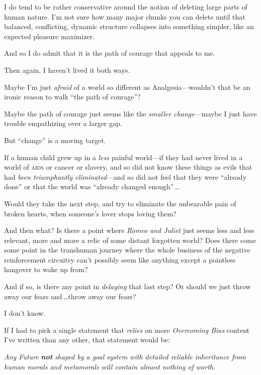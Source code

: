  I do tend to be rather conservative around the notion of deleting
large parts of human nature. I'm not sure how many
major chunks you can delete until that balanced, conflicting, dynamic
structure collapses into something simpler, like an expected pleasure
maximizer.


 And so I do admit that it is the path of courage that appeals to
me.


 Then again, I haven't lived it both ways.


 Maybe I'm just \textit{afraid} of a world so
different as Analgesia---wouldn't that be an ironic
reason to walk ``the path of
courage''?

{
 Maybe the path of courage just seems like the \textit{smaller
change}{}---maybe I just have trouble empathizing over a larger gap.}


 But ``change'' is a moving
target.


 If a human child grew up in a \textit{less} painful world---if
they had never lived in a world of \textsc{aids} or cancer or slavery, and so
did not know these things as evils that had \textit{been triumphantly
eliminated}{}---and so did not feel that they were
``already done'' or that the world
was ``already changed enough''\,\ldots


 Would they take the next step, and try to eliminate the unbearable
pain of broken hearts, when someone's lover stops
loving them?


 And then what? Is there a point where \textit{Romeo and Juliet}
just seems less and less relevant, more and more a relic of some
distant forgotten world? Does there come some point in the transhuman
journey where the whole business of the negative reinforcement
circuitry can't possibly seem like anything except a
pointless hangover to wake up from?


 And if so, is there any point in \textit{delaying} that last step?
Or should we just throw away our fears and\,\ldots throw away our fears?


 I don't know.

\myendsectiontext


\bigskip



 If I had to pick a single statement that \textit{relies} on more
\textit{Overcoming Bias} content I've written than any
other, that statement would be: 

{
 \textit{Any Future }\textbf{\textit{not}}\textit{ shaped by a goal
system with detailed reliable inheritance from human morals and
metamorals will contain almost nothing of worth.}}


